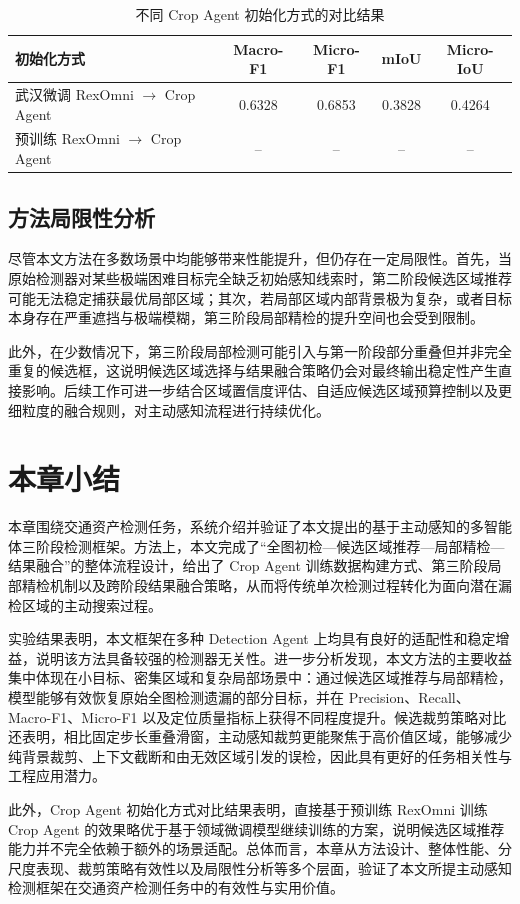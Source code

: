 
\begin{table}[htbp]
    \centering
    \caption{不同 Crop Agent 初始化方式的对比结果}
    \label{tab:crop_agent_init_compare}
    \begin{tabular}{lcccc}
        \toprule
        初始化方式 & Macro-F1 & Micro-F1 & mIoU & Micro-IoU \\
        \midrule
        武汉微调 RexOmni $\rightarrow$ Crop Agent & 0.6328 & 0.6853 & 0.3828 & 0.4264 \\
        预训练 RexOmni $\rightarrow$ Crop Agent & -- & -- & -- & -- \\
        \bottomrule
    \end{tabular}
\end{table}

\subsection{方法局限性分析}

尽管本文方法在多数场景中均能够带来性能提升，但仍存在一定局限性。首先，当原始检测器对某些极端困难目标完全缺乏初始感知线索时，第二阶段候选区域推荐可能无法稳定捕获最优局部区域；其次，若局部区域内部背景极为复杂，或者目标本身存在严重遮挡与极端模糊，第三阶段局部精检的提升空间也会受到限制。

此外，在少数情况下，第三阶段局部检测可能引入与第一阶段部分重叠但并非完全重复的候选框，这说明候选区域选择与结果融合策略仍会对最终输出稳定性产生直接影响。后续工作可进一步结合区域置信度评估、自适应候选区域预算控制以及更细粒度的融合规则，对主动感知流程进行持续优化。

\section{本章小结}

本章围绕交通资产检测任务，系统介绍并验证了本文提出的基于主动感知的多智能体三阶段检测框架。方法上，本文完成了“全图初检—候选区域推荐—局部精检—结果融合”的整体流程设计，给出了 Crop Agent 训练数据构建方式、第三阶段局部精检机制以及跨阶段结果融合策略，从而将传统单次检测过程转化为面向潜在漏检区域的主动搜索过程。

实验结果表明，本文框架在多种 Detection Agent 上均具有良好的适配性和稳定增益，说明该方法具备较强的检测器无关性。进一步分析发现，本文方法的主要收益集中体现在小目标、密集区域和复杂局部场景中：通过候选区域推荐与局部精检，模型能够有效恢复原始全图检测遗漏的部分目标，并在 Precision、Recall、Macro-F1、Micro-F1 以及定位质量指标上获得不同程度提升。候选裁剪策略对比还表明，相比固定步长重叠滑窗，主动感知裁剪更能聚焦于高价值区域，能够减少纯背景裁剪、上下文截断和由无效区域引发的误检，因此具有更好的任务相关性与工程应用潜力。

此外，Crop Agent 初始化方式对比结果表明，直接基于预训练 RexOmni 训练 Crop Agent 的效果略优于基于领域微调模型继续训练的方案，说明候选区域推荐能力并不完全依赖于额外的场景适配。总体而言，本章从方法设计、整体性能、分尺度表现、裁剪策略有效性以及局限性分析等多个层面，验证了本文所提主动感知检测框架在交通资产检测任务中的有效性与实用价值。
